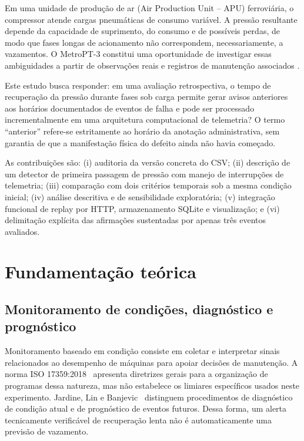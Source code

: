 \documentclass[conference]{IEEEtran}
\begin{document}
Em uma unidade de produção de ar (Air Production Unit -- APU) ferroviária, o compressor atende cargas pneumáticas de consumo variável. A pressão resultante depende da capacidade de suprimento, do consumo e de possíveis perdas, de modo que fases longas de acionamento não correspondem, necessariamente, a vazamentos. O MetroPT-3 constitui uma oportunidade de investigar essas ambiguidades a partir de observações reais e registros de manutenção associados \cite{davari2021metropt3,veloso2022metropt}.

Este estudo busca responder: em uma avaliação retrospectiva, o tempo de recuperação da pressão durante fases sob carga permite gerar avisos anteriores aos horários documentados de eventos de falha e pode ser processado incrementalmente em uma arquitetura computacional de telemetria? O termo ``anterior'' refere-se estritamente ao horário da anotação administrativa, sem garantia de que a manifestação física do defeito ainda não havia começado.

As contribuições são: (i) auditoria da versão concreta do CSV; (ii) descrição de um detector de primeira passagem de pressão com manejo de interrupções de telemetria; (iii) comparação com dois critérios temporais sob a mesma condição inicial; (iv) análise descritiva e de sensibilidade exploratória; (v) integração funcional de replay por HTTP, armazenamento SQLite e visualização; e (vi) delimitação explícita das afirmações sustentadas por apenas três eventos avaliados.

\section{Fundamentação teórica}

\subsection{Monitoramento de condições, diagnóstico e prognóstico}

Monitoramento baseado em condição consiste em coletar e interpretar sinais relacionados ao desempenho de máquinas para apoiar decisões de manutenção. A norma ISO 17359:2018~\cite{iso17359} apresenta diretrizes gerais para a organização de programas dessa natureza, mas não estabelece os limiares específicos usados neste experimento. Jardine, Lin e Banjevic~\cite{jardine2006review} distinguem procedimentos de diagnóstico de condição atual e de prognóstico de eventos futuros. Dessa forma, um alerta tecnicamente verificável de recuperação lenta não é automaticamente uma previsão de vazamento.
\end{document}
